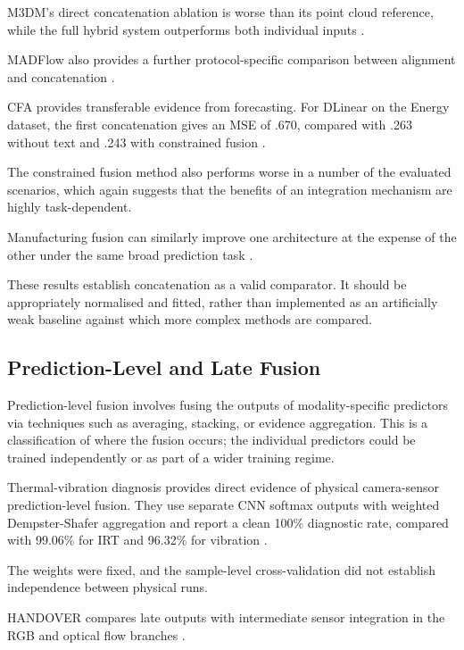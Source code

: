 M3DM's direct concatenation ablation is worse than its point cloud reference, while the full hybrid
system outperforms both individual inputs \parencite[Table~4]{Wang2023Multimodal}.

MADFlow also provides a further protocol-specific comparison between alignment and concatenation
\parencite{Li2025MADFlow}.

CFA provides transferable evidence from forecasting. For DLinear on the Energy dataset, the first
concatenation gives an MSE of .670, compared with .263 without text and .243 with constrained fusion
\parencite[PDF p.~4, Table~4]{P023}.

The constrained fusion method also performs worse in a number of the evaluated scenarios, which
again suggests that the benefits of an integration mechanism are highly task-dependent.

Manufacturing fusion can similarly improve one architecture at the expense of the other under the
same broad prediction task \parencite[Table~3]{Li2022A}.

These results establish concatenation as a valid comparator. It should be appropriately normalised
and fitted, rather than implemented as an artificially weak baseline against which more complex
methods are compared.

\subsection{Prediction-Level and Late Fusion}

Prediction-level fusion involves fusing the outputs of modality-specific predictors via techniques
such as averaging, stacking, or evidence aggregation. This is a classification of where the fusion
occurs; the individual predictors could be trained independently or as part of a wider training
regime.

Thermal-vibration diagnosis provides direct evidence of physical camera-sensor prediction-level
fusion. They use separate CNN softmax outputs with weighted Dempster-Shafer aggregation and report a
clean 100\% diagnostic rate, compared with 99.06\% for IRT and 96.32\% for vibration \parencite[Table~VII]{Huo2022Multisensor}.

The weights were fixed, and the sample-level cross-validation did not establish independence between
physical runs.

HANDOVER compares late outputs with intermediate sensor integration in the RGB and optical flow
branches \parencite[PDF pp.~5--7]{Thoduka2024Handover}.

